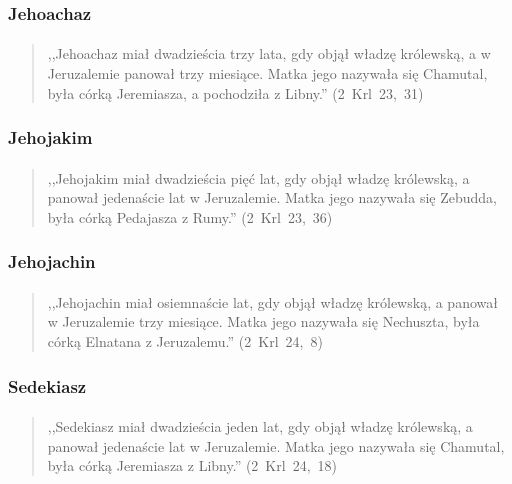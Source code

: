 \documentclass[10pt,a4paper,oneside]{article}
\begin{document}
\subsubsection{Jehoachaz}
\paragraph{}
\begin{quote}
,,Jehoachaz miał dwadzieścia trzy lata, gdy objął władzę królewską, a w Jeruzalemie panował trzy miesiące. Matka jego nazywała się Chamutal, była córką Jeremiasza, a pochodziła z Libny.'' \mbox{(2 Krl 23, 31)}
\end{quote}
\subsubsection{Jehojakim}
\paragraph{}
\begin{quote}
,,Jehojakim miał dwadzieścia pięć lat, gdy objął władzę królewską, a panował jedenaście lat w Jeruzalemie. Matka jego nazywała się Zebudda, była córką Pedajasza z Rumy.'' \mbox{(2 Krl 23, 36)}
\end{quote}
\subsubsection{Jehojachin}
\paragraph{}
\begin{quote}
,,Jehojachin miał osiemnaście lat, gdy objął władzę królewską, a panował w Jeruzalemie trzy miesiące. Matka jego nazywała się Nechuszta, była córką Elnatana z Jeruzalemu.'' \mbox{(2 Krl 24, 8)}
\end{quote}
\subsubsection{Sedekiasz}
\paragraph{}
\begin{quote}
,,Sedekiasz miał dwadzieścia jeden lat, gdy objął władzę królewską, a panował jedenaście lat w Jeruzalemie. Matka jego nazywała się Chamutal, była córką Jeremiasza z Libny.'' \mbox{(2 Krl 24, 18)}
\end{quote}
\end{document}
